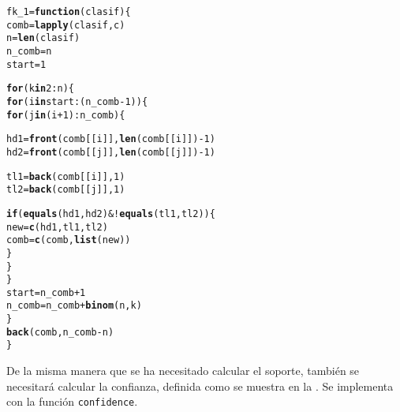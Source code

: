 \documentclass[12pt]{report}\usepackage[]{graphicx}\usepackage[dvipsnames]{xcolor}
\makeatletter
\newcommand{\hlnum}[1]{\textcolor[rgb]{0.686,0.059,0.569}{#1}}%
\newcommand{\hlopt}[1]{\textcolor[rgb]{0,0,0}{#1}}%
\newcommand{\hlstd}[1]{\textcolor[rgb]{0.345,0.345,0.345}{#1}}%
\newcommand{\hlkwa}[1]{\textcolor[rgb]{0.161,0.373,0.58}{\textbf{#1}}}%
\newcommand{\hlkwb}[1]{\textcolor[rgb]{0.69,0.353,0.396}{#1}}%
\newcommand{\hlkwc}[1]{\textcolor[rgb]{0.333,0.667,0.333}{#1}}%
\newcommand{\hlkwd}[1]{\textcolor[rgb]{0.737,0.353,0.396}{\textbf{#1}}}%
\newenvironment{kframe}{%
 \def\at@end@of@kframe{}%
 \ifinner\ifhmode%
  \def\at@end@of@kframe{\end{minipage}}%
  \begin{minipage}{\columnwidth}%
 \fi\fi%
 \def\FrameCommand##1{\hskip\@totalleftmargin \hskip-\fboxsep
 \colorbox{shadecolor}{##1}\hskip-\fboxsep
     \hskip-\linewidth \hskip-\@totalleftmargin \hskip\columnwidth}%
 \MakeFramed {\advance\hsize-\width
   \@totalleftmargin\z@ \linewidth\hsize
   \@setminipage}}%
 {\par\unskip\endMakeFramed%
 \at@end@of@kframe}
\newenvironment{knitrout}{}{} %
\makeatother
\begin{document}
\begin{knitrout}
\color{fgcolor}\begin{kframe}
\begin{alltt}
\hlstd{fk_1} \hlkwb{=} \hlkwa{function}\hlstd{(}\hlkwc{clasif}\hlstd{) \{}
        \hlstd{comb} \hlkwb{=} \hlkwd{lapply}\hlstd{(clasif, c)}
        \hlstd{n} \hlkwb{=} \hlkwd{len}\hlstd{(clasif)}
        \hlstd{n_comb} \hlkwb{=} \hlstd{n}
        \hlstd{start} \hlkwb{=} \hlnum{1}

        \hlkwa{for} \hlstd{(k} \hlkwa{in} \hlnum{2}\hlopt{:}\hlstd{n) \{}
                \hlkwa{for} \hlstd{(i} \hlkwa{in} \hlstd{start}\hlopt{:}\hlstd{(n_comb}\hlopt{-}\hlnum{1}\hlstd{)) \{}
                        \hlkwa{for} \hlstd{(j} \hlkwa{in} \hlstd{(i}\hlopt{+}\hlnum{1}\hlstd{)}\hlopt{:}\hlstd{n_comb) \{}

                                \hlstd{hd1} \hlkwb{=} \hlkwd{front}\hlstd{(comb[[i]],} \hlkwd{len}\hlstd{(comb[[i]])}\hlopt{-}\hlnum{1}\hlstd{)}
                                \hlstd{hd2} \hlkwb{=} \hlkwd{front}\hlstd{(comb[[j]],} \hlkwd{len}\hlstd{(comb[[j]])}\hlopt{-}\hlnum{1}\hlstd{)}

                                \hlstd{tl1} \hlkwb{=} \hlkwd{back}\hlstd{(comb[[i]],} \hlnum{1}\hlstd{)}
                                \hlstd{tl2} \hlkwb{=} \hlkwd{back}\hlstd{(comb[[j]],} \hlnum{1}\hlstd{)}

                                \hlkwa{if} \hlstd{(}\hlkwd{equals}\hlstd{(hd1, hd2)} \hlopt{& !}\hlkwd{equals}\hlstd{(tl1, tl2)) \{}
                                        \hlstd{new} \hlkwb{=} \hlkwd{c}\hlstd{(hd1, tl1, tl2)}
                                        \hlstd{comb} \hlkwb{=} \hlkwd{c}\hlstd{(comb,} \hlkwd{list}\hlstd{(new))}
                                \hlstd{\}}
                        \hlstd{\}}
                \hlstd{\}}
                \hlstd{start} \hlkwb{=} \hlstd{n_comb} \hlopt{+} \hlnum{1}
                \hlstd{n_comb} \hlkwb{=} \hlstd{n_comb} \hlopt{+} \hlkwd{binom}\hlstd{(n, k)}
        \hlstd{\}}
        \hlkwd{back}\hlstd{(comb, n_comb}\hlopt{-}\hlstd{n)}
\hlstd{\}}
\end{alltt}
\end{kframe}
\end{knitrout}
			
			De la misma manera que se ha necesitado calcular el soporte, también se necesitará calcular la confianza, definida como se muestra en la . Se implementa con la función \texttt{confidence}. 
			
\end{document}
